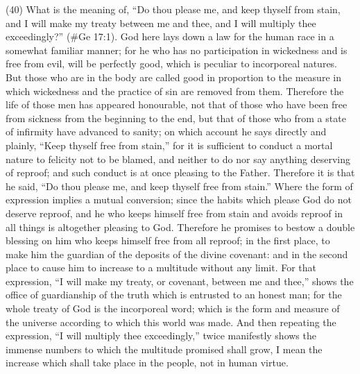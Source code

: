 (40) What is the meaning of, ``Do thou please me, and keep thyself from stain, and I will make my
treaty between me and thee, and I will multiply thee exceedingly?'' (\#Ge 17:1). God here lays
down a law for the human race in a somewhat familiar manner; for he who has no participation in
wickedness and is free from evil, will be perfectly good, which is peculiar to incorporeal natures.
But those who are in the body are called good in proportion to the measure in which wickedness
and the practice of sin are removed from them. Therefore the life of those men has appeared
honourable, not that of those who have been free from sickness from the beginning to the end, but
that of those who from a state of infirmity have advanced to sanity; on which account he says
directly and plainly, ``Keep thyself free from stain,'' for it is sufficient to conduct a mortal nature to
felicity not to be blamed, and neither to do nor say anything deserving of reproof; and such conduct
is at once pleasing to the Father. Therefore it is that he said, ``Do thou please me, and keep thyself
free from stain.'' Where the form of expression implies a mutual conversion; since the habits which
please God do not deserve reproof, and he who keeps himself free from stain and avoids reproof
in all things is altogether pleasing to God. Therefore he promises to bestow a double blessing on
him who keeps himself free from all reproof; in the first place, to make him the guardian of the
deposits of the divine covenant: and in the second place to cause him to increase to a multitude
without any limit. For that expression, ``I will make my treaty, or covenant, between me and thee,''
shows the office of guardianship of the truth which is entrusted to an honest man; for the whole
treaty of God is the incorporeal word; which is the form and measure of the universe according to
which this world was made. And then repeating the expression, ``I will multiply thee exceedingly,''
twice manifestly shows the immense numbers to which the multitude promised shall grow, I mean
the increase which shall take place in the people, not in human virtue.

